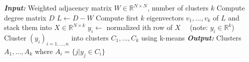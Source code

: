 \documentclass[a4paper]{article}
\begin{document}
\begin{algorithm}[H]
\begin{algorithmic}[H]
\State \textbf{\textit{Input:}} Weighted adjacency matrix $W \in \mathbb{R}^{N \times N}$, number of clusters $k$
\State Compute degree matrix $D$
\State $L \gets D - W$
\State Compute first $k$ eigenvectors $v_1, ..., v_k$  of $L$ and stack them into $X \in \mathbb{R}^{N \times k}$
\State $y_i \gets$ normalized ith row of $X \quad$   (note: $y_i \in \mathbb{R}^{k}$)
\State Cluster $(y_i)_{i=1,...,n}$ into clusters $C_1, ..., C_k$ using k-means
\State \textbf{\textit{Output:}} Clusters $A_1,...,A_k$ where $A_i = \{j | y_j \in C_i \}$
\end{algorithmic}
\end{algorithm}
\end{document}
